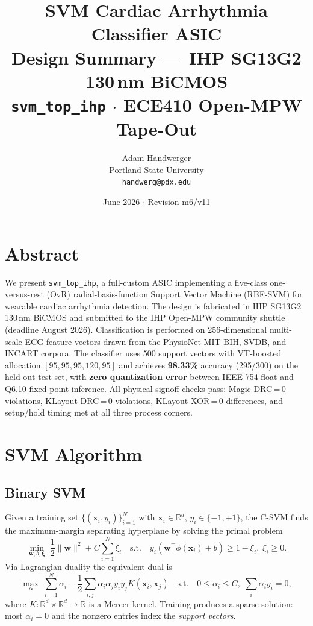 \documentclass[11pt]{article}
\title{\textbf{SVM Cardiac Arrhythmia Classifier ASIC}\\
  \large Design Summary --- IHP SG13G2 130\,nm BiCMOS\\[4pt]
  \normalsize \texttt{svm\_top\_ihp} $\cdot$ ECE410 Open-MPW Tape-Out}
\author{Adam Handwerger\\
  Portland State University\\
  \texttt{handwerg@pdx.edu}}
\date{June 2026 $\cdot$ Revision m6/v11}
\newcommand{\R}{\mathbb{R}}
\begin{document}
\maketitle
\tableofcontents
\newpage

\section{Abstract}

We present \texttt{svm\_top\_ihp}, a full-custom ASIC implementing a five-class
one-versus-rest (OvR) radial-basis-function Support Vector Machine (RBF-SVM) for
wearable cardiac arrhythmia detection.  The design is fabricated in IHP SG13G2
130\,nm BiCMOS and submitted to the IHP Open-MPW community shuttle (deadline August
2026).  Classification is performed on 256-dimensional multi-scale ECG feature
vectors drawn from the PhysioNet MIT-BIH, SVDB, and INCART corpora.  The
classifier uses 500 support vectors with VT-boosted allocation $[95,95,95,120,95]$
and achieves \textbf{98.33\%} accuracy (295/300) on the held-out test set,
with \textbf{zero quantization error} between IEEE-754 float and Q6.10 fixed-point
inference.  All physical signoff checks pass: Magic DRC\,=\,0 violations,
KLayout DRC\,=\,0 violations, KLayout XOR\,=\,0 differences, and setup/hold
timing met at all three process corners.

\section{SVM Algorithm}

\subsection{Binary SVM}

Given a training set $\{(\mathbf{x}_i,y_i)\}_{i=1}^{N}$ with
$\mathbf{x}_i \in \R^d$, $y_i \in \{-1,+1\}$, the C-SVM finds the
maximum-margin separating hyperplane by solving the primal problem
\begin{equation}
  \min_{\mathbf{w},b,\boldsymbol{\xi}}\;
  \frac{1}{2}\|\mathbf{w}\|^2 + C\sum_{i=1}^{N}\xi_i
  \quad\text{s.t.}\quad
  y_i(\mathbf{w}^\top\phi(\mathbf{x}_i)+b) \ge 1-\xi_i,\;\xi_i\ge 0.
  \label{eq:primal}
\end{equation}
Via Lagrangian duality the equivalent dual is
\begin{equation}
  \max_{\boldsymbol{\alpha}}\;
  \sum_{i=1}^{N}\alpha_i
  - \frac{1}{2}\sum_{i,j}\alpha_i\alpha_j y_i y_j K(\mathbf{x}_i,\mathbf{x}_j)
  \quad\text{s.t.}\quad
  0 \le \alpha_i \le C,\;
  \sum_{i}\alpha_i y_i = 0,
  \label{eq:dual}
\end{equation}
where $K:\R^d\times\R^d\to\R$ is a Mercer kernel.  Training produces a sparse
solution: most $\alpha_i = 0$ and the nonzero entries index the \emph{support vectors}.
\end{document}
